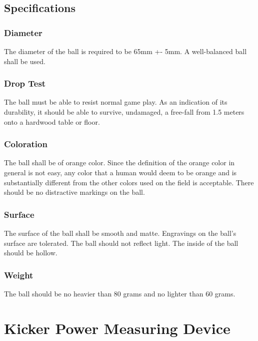 \documentclass{article}
\begin{document}
\subsection{Specifications}

\subsubsection{Diameter}

The diameter of the ball is required to be 65mm +- 5mm. A well-balanced ball shall be used.

\subsubsection{Drop Test}

The ball must be able to resist normal game play. As an indication of its durability, it should be able to survive, undamaged, a free-fall from 1.5 meters onto a hardwood table or floor.

\subsubsection{Coloration}

The ball shall be of orange color. Since the definition of the orange color in general is not easy, any color that a human would deem to be orange and is substantially different from the other colors used on the field is acceptable. There should be no distractive markings on the ball.

\subsubsection{Surface}

The surface of the ball shall be smooth and matte. Engravings on the ball's surface are tolerated. The ball should not reflect light. The inside of the ball should be hollow.

\subsubsection{Weight}

The ball should be no heavier than 80 grams and no lighter than 60 grams.

\section{Kicker Power Measuring Device\label{ref-064}}
\end{document}
